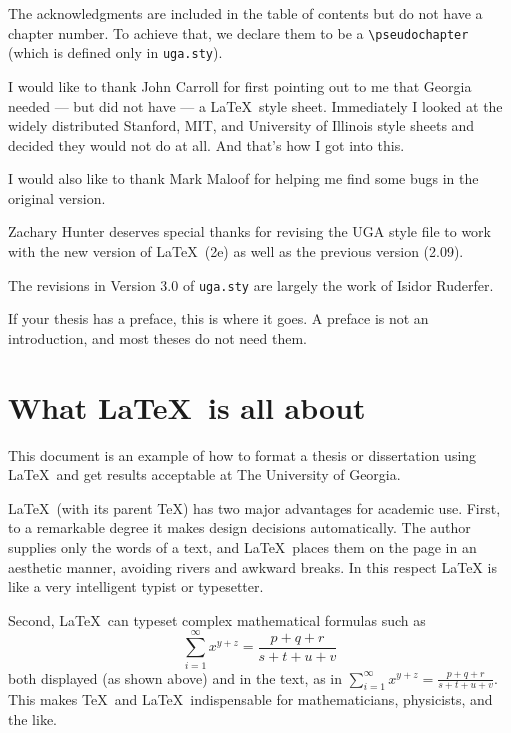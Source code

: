 \documentclass[12pt]{report}
\begin{document}
The acknowledgments are included in the table of contents but do
not have a chapter number.  To achieve that, we
declare them to be a \verb"\pseudochapter" (which is defined only in \verb"uga.sty").

I would like to thank John Carroll for first pointing out to me that
Georgia needed --- but did not have --- a \LaTeX\ style sheet.
Immediately I looked at the widely distributed Stanford, MIT, and
University of Illinois style sheets and decided they would not do at
all. And that's how I got into this.

I would also like to thank Mark Maloof for helping me find some bugs in
the original version.

Zachary Hunter deserves special thanks for revising the UGA style
file to work with the new version of \LaTeX\ (2e) as well as the
previous version (2.09).

The revisions in
Version 3.0 of \verb"uga.sty" are
largely the work of Isidor Ruderfer.



If your thesis has a preface, this is where it goes.
A preface is not an introduction, and most theses do not need them.


\tableofcontents

\listoffigures   %
\listoftables    %

\newpage
{}  %

\chapter{What \LaTeX\ is all about}

This document is an example of how to format a thesis or dissertation
using \LaTeX\  and get results acceptable at The University of Georgia.

\LaTeX\ (with its parent \TeX)
has two major advantages for academic use.  First, to a remarkable
degree it makes design decisions automatically.  The author supplies
only the words of a text, and \LaTeX\ places them on the page in an
aesthetic manner, avoiding rivers and awkward breaks.  In this respect
LaTeX is like a very intelligent typist or typesetter.

Second, \LaTeX\ can typeset complex mathematical formulas such as
\[
\sum_{i=1}^{\infty} x^{y+z} = \frac{p+q+r}{s+t+u+v}
\]
both displayed (as shown above) and in the text, as in
$\sum_{i=1}^{\infty} x^{y+z} = \frac{p+q+r}{s+t+u+v}$.
This makes \TeX\ and \LaTeX\ indispensable for mathematicians, physicists,
and the like.
\end{document}
